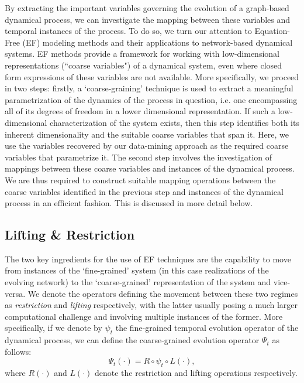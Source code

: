 By extracting the important variables governing the evolution of a
graph-based dynamical process, we can investigate the mapping between
these variables and temporal instances of the process. To do so, we
turn our attention to Equation-Free (EF) modeling methods
\cite{gear_equation-free_2003} \cite{kevrekidis_equation-free:_2004} and their
applications to network-based dynamical systems. EF methods provide a
framework for working with low-dimensional representations (``coarse
variables") of a dynamical system, even where closed form expressions
of these variables are not available. More specifically, we proceed in
two steps: firstly, a `coarse-graining' technique is used to extract a
meaningful parametrization of the dynamics of the process in question,
i.e. one encompassing all of its degrees of freedom in a lower
dimensional representation. If such a low-dimensional characterization
of the system exists, then this step identifies both its inherent
dimensionality and the suitable coarse variables that span it. Here,
we use the variables recovered by our data-mining approach as the
required coarse variables that parametrize it. The second step
involves the investigation of mappings between these coarse variables
and instances of the dynamical process. We are thus required to
construct suitable mapping operations between the coarse variables
identified in the previous step and instances of the dynamical process
in an efficient fashion. This is discussed in more detail below.



\subsection{Lifting \& Restriction}

The two key ingredients for the use of EF techniques are the
capability to move from instances of the `fine-grained' system (in
this case realizations of the evolving network) to the
`coarse-grained' representation of the system and vice-versa. We
denote the operators defining the movement between these two regimes
as {\em restriction} and {\em lifting} respectively, with the latter
usually posing a much larger computational challenge and involving
multiple instances of the former. More specifically, if we denote by
$\psi_t$ the fine-grained temporal evolution operator of the dynamical
process, we can define the coarse-grained evolution operator $\Psi_t$
as follows:
\begin{equation}
  \Psi_t ( \cdot ) = R \circ \psi_t \circ L ( \cdot ),
\end{equation}
\noindent where $R(\cdot)$ and $L(\cdot)$ denote the restriction and
lifting operations respectively.

